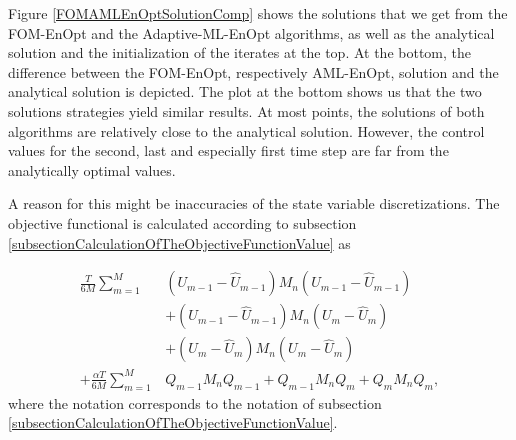 Figure \ref{FOMAMLEnOptSolutionComp} shows the solutions that we get from the FOM-EnOpt and the Adaptive-ML-EnOpt algorithms, as well as the analytical solution and the initialization of the iterates at the top. At the bottom, the difference between the FOM-EnOpt, respectively AML-EnOpt, solution and the analytical solution is depicted. The plot at the bottom shows us that the two solutions strategies yield similar results. At most points, the solutions of both algorithms are relatively close to the analytical solution. However, the control values for the second, last and especially first time step are far from the analytically optimal values.

A reason for this might be inaccuracies of the state variable discretizations. The objective functional is calculated according to subsection \ref{subsectionCalculationOfTheObjectiveFunctionValue} as

\begin{equation}
\label{discretizedObjectiveFunctionalRep}
\begin{aligned}
\frac{T}{6M}\sum_{m=1}^M&\left(U_{m-1}-\hat{U}_{m-1}\right)M_n\left(U_{m-1}-\hat{U}_{m-1}\right)\\
&+ \left(U_{m-1}-\hat{U}_{m-1}\right)M_n\left(U_{m}-\hat{U}_{m}\right)\\
&+ \left(U_{m}-\hat{U}_{m}\right)M_n\left(U_{m}-\hat{U}_{m}\right)\\
+ \frac{\alpha T}{6M}\sum_{m=1}^M&Q_{m-1}M_nQ_{m-1} + Q_{m-1}M_nQ_{m} + Q_{m}M_nQ_{m},
\end{aligned}
\end{equation}
where the notation corresponds to the notation of subsection \ref{subsectionCalculationOfTheObjectiveFunctionValue}.

